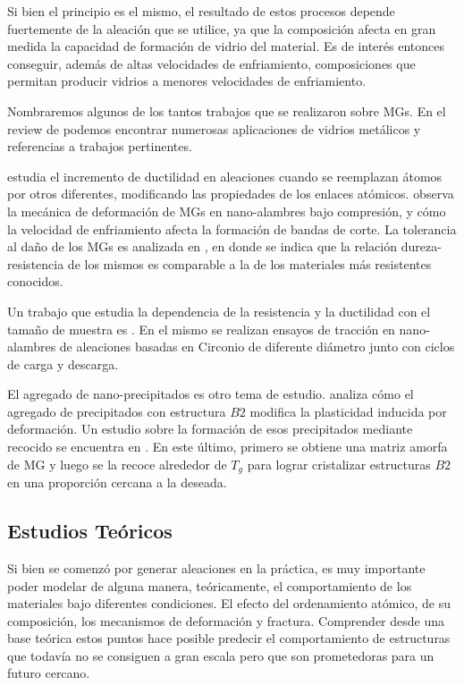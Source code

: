 Si bien el principio es el mismo, el resultado de estos procesos depende fuertemente de la aleación que se utilice, ya que la composición afecta en gran medida la capacidad de formación de vidrio del material. Es de interés entonces conseguir, además de altas velocidades de enfriamiento, composiciones que permitan producir vidrios a menores velocidades de enfriamiento.

Nombraremos algunos de los tantos trabajos que se realizaron sobre MGs. En el review de \cite{Axinte11} podemos encontrar numerosas aplicaciones de vidrios metálicos y referencias a trabajos pertinentes.

\cite{Zheng12} estudia el incremento de ductilidad en aleaciones cuando se reemplazan átomos por otros diferentes, modificando las propiedades de los enlaces atómicos. \cite{xiao12} observa la mecánica de deformación de MGs en nano-alambres bajo compresión, y cómo la velocidad de enfriamiento afecta la formación de bandas de corte. La tolerancia al daño de los MGs es analizada en \citep{Demetriou11}, en donde se indica que la relación dureza-resistencia de los mismos es comparable a la de los materiales más resistentes conocidos.

Un trabajo que estudia la dependencia de la resistencia y la ductilidad con el tamaño de muestra es \citep{Dongchan10}. En el mismo se realizan ensayos de tracción en nano-alambres de aleaciones basadas en Circonio de diferente diámetro junto con ciclos de carga y descarga.

El agregado de nano-precipitados es otro tema de estudio. \cite{kuo14} analiza cómo el agregado de precipitados con estructura $B2$ modifica la plasticidad inducida por deformación. Un estudio sobre la formación de esos precipitados mediante recocido se encuentra en \citep{wei14}. En este último, primero se obtiene una matriz amorfa de MG y luego se la recoce alrededor de $T_{g}$ para lograr cristalizar estructuras $B2$ en una proporción cercana a la deseada.


\subsection{Estudios Teóricos}
\label{S1_2_2}

Si bien se comenzó por generar aleaciones en la práctica, es muy importante poder modelar de alguna manera, teóricamente, el comportamiento de los materiales bajo diferentes condiciones. El efecto del ordenamiento atómico, de su composición, los mecanismos de deformación y fractura. Comprender desde una base teórica estos puntos hace posible predecir el comportamiento de estructuras que todavía no se consiguen a gran escala pero que son prometedoras para un futuro cercano.

